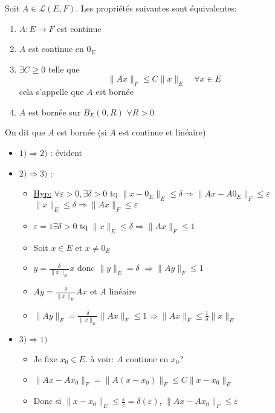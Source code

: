 \documentclass[a4paper]{report}
\let\implies\Rightarrow
\theoremstyle{definition}
\begin{document}
\begin{theorem}
    Soit $A \in \mathcal{L}(E, F)$. Les propriétés suivantes sont équivalentes:
    \begin{enumerate}
        \item $A: E \to F$ est continue
        \item $A$ est continue en  $0_E$
        \item  $\exists C \ge 0$ telle que 
            \[
            \|Ax\|_F \le C\|x\|_E \quad \forall x \in E
            \] 
            cela s'appelle que $A$ est bornée
        \item $A$ est bornée sur  $B_E(0, R)$ $\forall R > 0$
    \end{enumerate}
    On dit que $A$ est bornée (si $A$ est continue et linéaire)
\end{theorem}
\begin{preuve}
    \begin{itemize}
        \item $1) \implies 2)$ : évident
        \item $2) \implies 3)$ : 
            \begin{itemize}
                \item 
                    \underline{Hyp:} $\forall \varepsilon >0, \exists \delta > 0$ tq $\|x - 0_E\|_E \le \delta \implies \|Ax - A0_E\|_F \le \varepsilon$ $\|x\|_E \le \delta \implies \|Ax\|_F \le \varepsilon$
                \item $\varepsilon = 1 \exists \delta > 0$ tq $\|x\|_E \le \delta \implies \|Ax\|_F \le 1$
                \item Soit $ x \in E$ et $x \neq 0_E$
                \item $y = \frac{\delta}{\|x\|_E}x$ donc $\|y\|_E = \delta$  $\implies\|Ay\|_F \le 1$
                \item $Ay = \frac{\delta}{\|x\|_{E}}Ax$ et $A$ linéaire
                \item  $\|Ay\|_{F} = \frac{\delta}{\|x\|_E}\|Ax\|_F \le 1 \implies \|Ax\|_F \le \frac{1}{\delta}\|x\|_E$
            \end{itemize}
        \item $3) \implies 1)$ 
            \begin{itemize}
                \item Je fixe $x_0 \in E$. à voir: $A$ continue en  $x_0$?
                \item $\|Ax - Ax_0\|_F = \|A(x - x_0)\|_F \le C\|x - x_0\|_E$
                \item Donc si $\|x - x_0\|_E \le \frac{\varepsilon}{c} = \delta(\varepsilon)$, $\|Ax - Ax_0\|_F \le \varepsilon$
            \end{itemize}
    \end{itemize}
\end{preuve}
\end{document}
